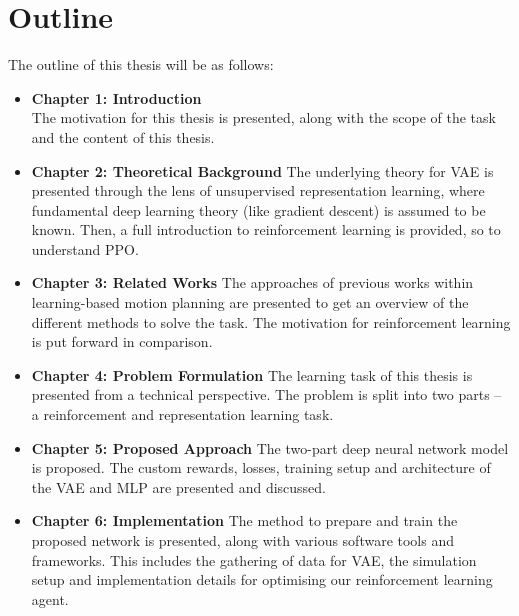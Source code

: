 

\section{Outline}

The outline of this thesis will be as follows:
\vspace{2mm}
\begin{itemize}
    \item \textbf{Chapter 1: Introduction} \\
    The motivation for this thesis is presented, along with the scope of the task and the content of this thesis. \vspace{3mm}

    \item \textbf{Chapter 2: Theoretical Background}
    The underlying theory for VAE is presented through the lens of unsupervised representation learning, where fundamental deep learning theory (like gradient descent) is assumed to be known. Then, a full introduction to reinforcement learning is provided, so to understand PPO.
    \vspace{3mm}
    
    \item \textbf{Chapter 3: Related Works} 
    The approaches of previous works within learning-based motion planning are presented to get an overview of the different methods to solve the task. The motivation for reinforcement learning is put forward in comparison.
    \vspace{3mm}
    
    \item \textbf{Chapter 4: Problem Formulation}
    The learning task of this thesis is presented from a technical perspective. The problem is split into two parts -- a reinforcement and representation learning task.
    \vspace{3mm}
    
    \item \textbf{Chapter 5: Proposed Approach}
    The two-part deep neural network model is proposed. The custom rewards, losses, training setup and architecture of the VAE and MLP are presented and discussed.
    \vspace{3mm}
    
    \item \textbf{Chapter 6: Implementation}
    The method to prepare and train the proposed network is presented, along with various software tools and frameworks. This includes the gathering of data for VAE, the simulation setup and implementation details for optimising our reinforcement learning agent.
    \vspace{3mm}
    

\end{itemize}
